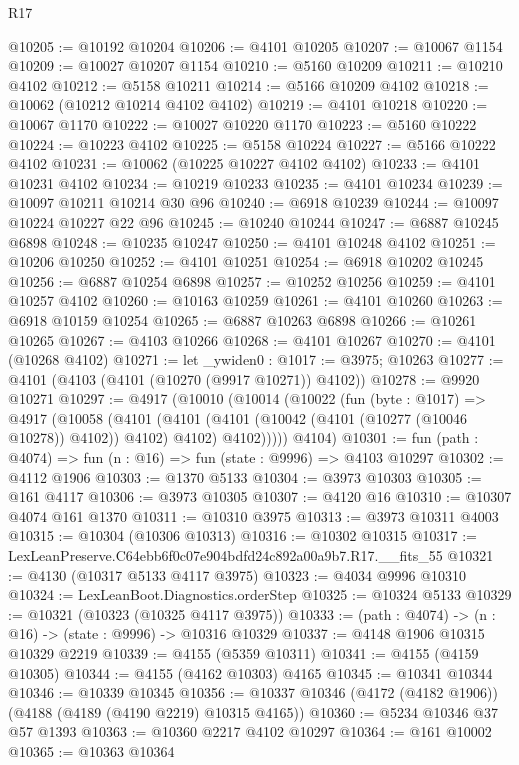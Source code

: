 \begin{lexlean}{R17}
\begin{coremodule}
@10205 := @10192 @10204
@10206 := @4101 @10205
@10207 := @10067 @1154
@10209 := @10027 @10207 @1154
@10210 := @5160 @10209
@10211 := @10210 @4102
@10212 := @5158 @10211
@10214 := @5166 @10209 @4102
@10218 := @10062 (@10212 @10214 @4102 @4102)
@10219 := @4101 @10218
@10220 := @10067 @1170
@10222 := @10027 @10220 @1170
@10223 := @5160 @10222
@10224 := @10223 @4102
@10225 := @5158 @10224
@10227 := @5166 @10222 @4102
@10231 := @10062 (@10225 @10227 @4102 @4102)
@10233 := @4101 @10231 @4102
@10234 := @10219 @10233
@10235 := @4101 @10234
@10239 := @10097 @10211 @10214 @30 @96
@10240 := @6918 @10239
@10244 := @10097 @10224 @10227 @22 @96
@10245 := @10240 @10244
@10247 := @6887 @10245 @6898
@10248 := @10235 @10247
@10250 := @4101 @10248 @4102
@10251 := @10206 @10250
@10252 := @4101 @10251
@10254 := @6918 @10202 @10245
@10256 := @6887 @10254 @6898
@10257 := @10252 @10256
@10259 := @4101 @10257 @4102
@10260 := @10163 @10259
@10261 := @4101 @10260
@10263 := @6918 @10159 @10254
@10265 := @6887 @10263 @6898
@10266 := @10261 @10265
@10267 := @4103 @10266
@10268 := @4101 @10267
@10270 := @4101 (@10268 @4102)
@10271 := let _ywiden0 : @1017 := @3975; @10263
@10277 := @4101 (@4103 (@4101 (@10270 (@9917 @10271)) @4102))
@10278 := @9920 @10271
@10297 := @4917
    (@10010
      (@10014
        (@10022
          (fun (byte : @1017) =>
          @4917
            (@10058
              (@4101
                (@4101 (@4101 (@10042 (@4101 (@10277 (@10046 @10278)) @4102)) @4102) @4102)
                @4102)))))
      @4104)
@10301 := fun (path : @4074) => fun (n : @16) => fun (state : @9996) => @4103 @10297
@10302 := @4112 @1906
@10303 := @1370 @5133
@10304 := @3973 @10303
@10305 := @161 @4117
@10306 := @3973 @10305
@10307 := @4120 @16
@10310 := @10307 @4074 @161 @1370
@10311 := @10310 @3975
@10313 := @3973 @10311 @4003
@10315 := @10304 (@10306 @10313)
@10316 := @10302 @10315
@10317 := LexLeanPreserve.C64ebb6f0c07e904bdfd24c892a00a9b7.R17.__fits_55
@10321 := @4130 (@10317 @5133 @4117 @3975)
@10323 := @4034 @9996 @10310
@10324 := LexLeanBoot.Diagnostics.orderStep
@10325 := @10324 @5133
@10329 := @10321 (@10323 (@10325 @4117 @3975))
@10333 := (path : @4074) -> (n : @16) -> (state : @9996) -> @10316 @10329
@10337 := @4148 @1906 @10315 @10329 @2219
@10339 := @4155 (@5359 @10311)
@10341 := @4155 (@4159 @10305)
@10344 := @4155 (@4162 @10303) @4165
@10345 := @10341 @10344
@10346 := @10339 @10345
@10356 := @10337 @10346 (@4172 (@4182 @1906)) (@4188 (@4189 (@4190 @2219) @10315 @4165))
@10360 := @5234 @10346 @37 @57 @1393
@10363 := @10360 @2217 @4102 @10297
@10364 := @161 @10002
@10365 := @10363 @10364

\end{coremodule}
\end{lexlean}
